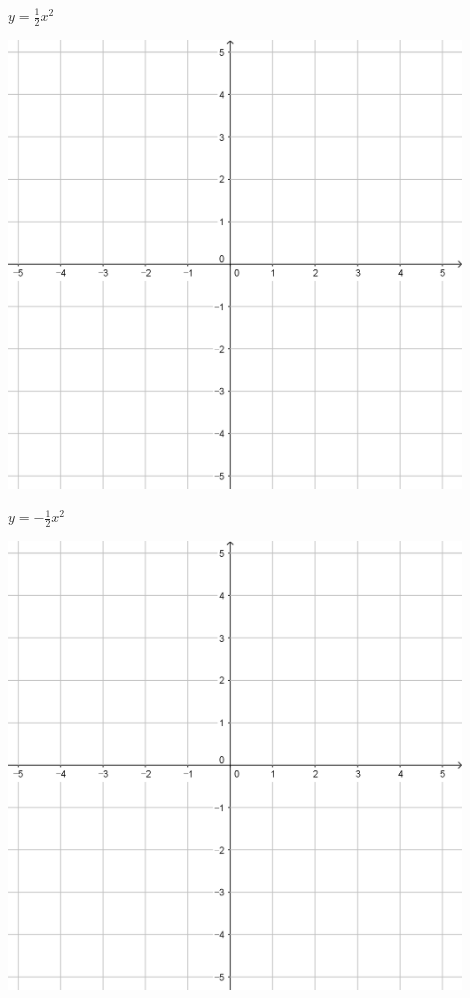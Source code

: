 \documentclass[a4paper]{oblivoir}
\begin{document}
\begin{minipage}{0.45\textwidth}\centering
\(y=\frac12x^2\)
\par\bigskip\includegraphics[width=0.9\textwidth]{55}
\end{minipage}
\begin{minipage}{0.45\textwidth}\centering
\(y=-\frac12x^2\)
\par\bigskip\includegraphics[width=0.9\textwidth]{55}
\end{minipage}\bigskip\bigskip\par
\end{document}

